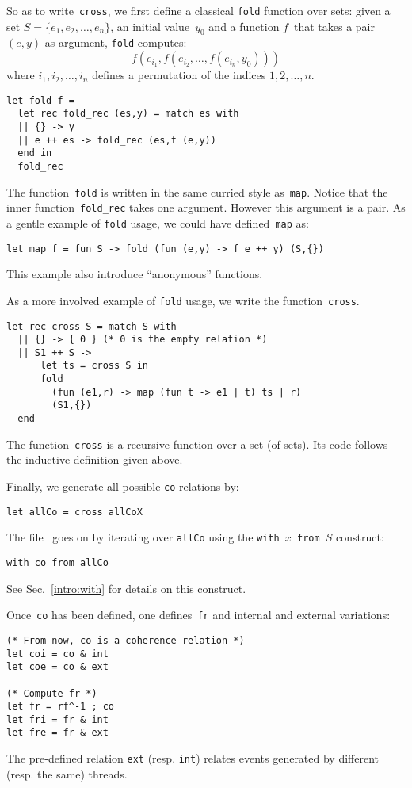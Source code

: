 So as to write~\texttt{cross},
we first define a classical \texttt{fold} function over sets:
given a set $S = \{ e_1, e_2, \ldots, e_n\}$, an initial value~$y_0$
and a function $f$~that takes a pair $(e,y)$ as argument,
\texttt{fold} computes:
$$
f (e_{i_1},f (e_{i_2}, \ldots, f(e_{i_n},y_0)))
$$
where $i_1, i_2, \ldots, i_n$ defines a permutation
of the indices $1, 2, \ldots, n$.
\begin{verbatim}
let fold f =
  let rec fold_rec (es,y) = match es with
  || {} -> y
  || e ++ es -> fold_rec (es,f (e,y))
  end in
  fold_rec
\end{verbatim}
The function~\texttt{fold} is written in the same curried style as~\texttt{map}.
Notice that the inner function~\verb+fold_rec+ takes one argument.
However this argument is a pair.
As a gentle example of \texttt{fold} usage, we could have
defined~\texttt{map} as:
\begin{verbatim}
let map f = fun S -> fold (fun (e,y) -> f e ++ y) (S,{})
\end{verbatim}
This example also introduce ``anonymous'' functions.


As a more involved example of \texttt{fold} usage, we
 write the function~\texttt{cross}.
\begin{verbatim}
let rec cross S = match S with
  || {} -> { 0 } (* 0 is the empty relation *)
  || S1 ++ S ->
      let ts = cross S in
      fold
        (fun (e1,r) -> map (fun t -> e1 | t) ts | r)
        (S1,{})
  end
\end{verbatim}
The function~\texttt{cross} is a recursive function over a set (of sets).
Its code follows the inductive definition given above.

Finally, we generate all possible \texttt{co} relations by:
\begin{verbatim}
let allCo = cross allCoX
\end{verbatim}

The file~ goes on by iterating over \texttt{allCo} using
the \texttt{with $x$ from~$S$} construct:
\begin{verbatim}
with co from allCo
\end{verbatim}
See Sec.~\ref{intro:with} for details on this construct.

Once~\texttt{co} has been defined, one defines~\texttt{fr} and
internal and external variations:
\begin{verbatim}
(* From now, co is a coherence relation *)
let coi = co & int
let coe = co & ext

(* Compute fr *)
let fr = rf^-1 ; co
let fri = fr & int
let fre = fr & ext
\end{verbatim}
The pre-defined relation \texttt{ext} (resp. \texttt{int}) relates
events generated by different (resp. the same) threads.


